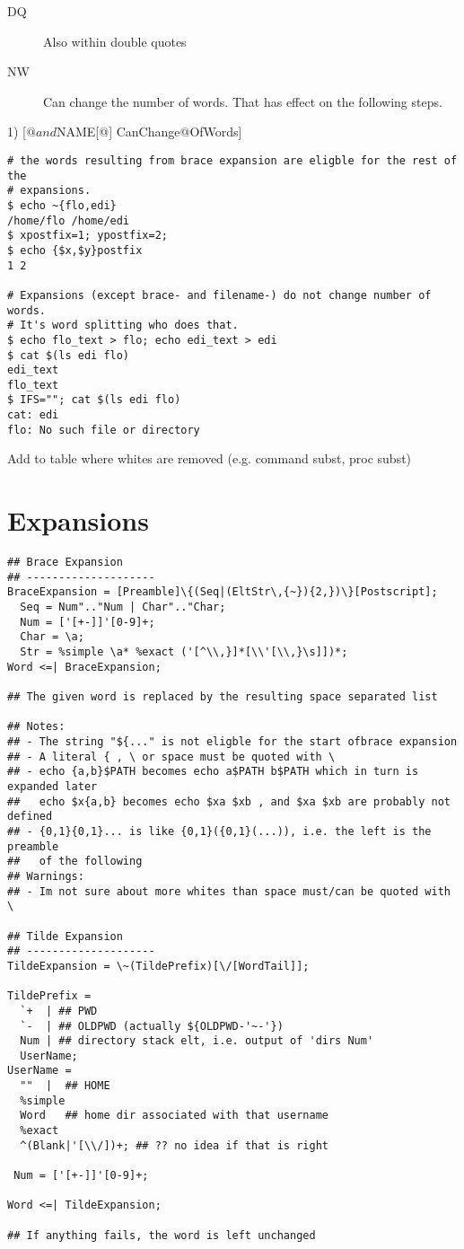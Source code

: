 \documentclass{article}
\begin{document}
\begin{description}
\item[DQ] Also within double quotes
\item[NW] Can change the number of words. That has effect on the following steps.
\end{description}

1) [$@ and ${NAME[@]} CanChange@OfWords]  

\begin{verbatim}
# the words resulting from brace expansion are eligble for the rest of the
# expansions.
$ echo ~{flo,edi} 
/home/flo /home/edi
$ xpostfix=1; ypostfix=2;
$ echo {$x,$y}postfix
1 2

# Expansions (except brace- and filename-) do not change number of words. 
# It's word splitting who does that.
$ echo flo_text > flo; echo edi_text > edi
$ cat $(ls edi flo)
edi_text
flo_text
$ IFS=""; cat $(ls edi flo)
cat: edi
flo: No such file or directory
\end{verbatim}

Add to table where whites are removed (e.g. command subst, proc subst)  
  


\section{Expansions}

\begin{verbatim}
## Brace Expansion
## --------------------
BraceExpansion = [Preamble]\{(Seq|(EltStr\,{~}){2,})\}[Postscript];
  Seq = Num".."Num | Char".."Char;
  Num = ['[+-]]'[0-9]+;
  Char = \a;
  Str = %simple \a* %exact ('[^\\,}]*[\\'[\\,}\s]])*;
Word <=| BraceExpansion;   
     
## The given word is replaced by the resulting space separated list
     
## Notes:
## - The string "${..." is not eligble for the start ofbrace expansion
## - A literal { , \ or space must be quoted with \   
## - echo {a,b}$PATH becomes echo a$PATH b$PATH which in turn is expanded later   
##   echo $x{a,b} becomes echo $xa $xb , and $xa $xb are probably not defined
## - {0,1}{0,1}... is like {0,1}({0,1}(...)), i.e. the left is the preamble
##   of the following
## Warnings:
## - Im not sure about more whites than space must/can be quoted with \

## Tilde Expansion
## --------------------
TildeExpansion = \~(TildePrefix)[\/[WordTail]];
  
TildePrefix =
  `+  | ## PWD
  `-  | ## OLDPWD (actually ${OLDPWD-'~-'})
  Num | ## directory stack elt, i.e. output of 'dirs Num'
  UserName; 
UserName =
  ""  |  ## HOME
  %simple
  Word   ## home dir associated with that username
  %exact
  ^(Blank|'[\\/])+; ## ?? no idea if that is right

 Num = ['[+-]]'[0-9]+;
 
Word <=| TildeExpansion;               
     
## If anything fails, the word is left unchanged               
\end{verbatim}
\end{document}
